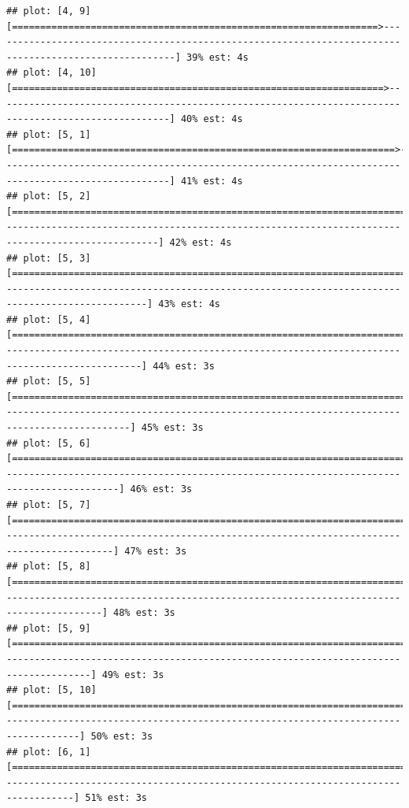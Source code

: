 \documentclass[
]{article}
\begin{document}
\begin{verbatim}
## plot: [4, 9] [=================================================================>-------------------------------------------------------------------------------------------------------] 39% est: 4s 
## plot: [4, 10] [==================================================================>-----------------------------------------------------------------------------------------------------] 40% est: 4s 
## plot: [5, 1] [====================================================================>----------------------------------------------------------------------------------------------------] 41% est: 4s 
## plot: [5, 2] [======================================================================>--------------------------------------------------------------------------------------------------] 42% est: 4s 
## plot: [5, 3] [========================================================================>------------------------------------------------------------------------------------------------] 43% est: 4s 
## plot: [5, 4] [=========================================================================>-----------------------------------------------------------------------------------------------] 44% est: 3s 
## plot: [5, 5] [===========================================================================>---------------------------------------------------------------------------------------------] 45% est: 3s 
## plot: [5, 6] [=============================================================================>-------------------------------------------------------------------------------------------] 46% est: 3s 
## plot: [5, 7] [==============================================================================>------------------------------------------------------------------------------------------] 47% est: 3s 
## plot: [5, 8] [================================================================================>----------------------------------------------------------------------------------------] 48% est: 3s 
## plot: [5, 9] [==================================================================================>--------------------------------------------------------------------------------------] 49% est: 3s 
## plot: [5, 10] [===================================================================================>------------------------------------------------------------------------------------] 50% est: 3s 
## plot: [6, 1] [=====================================================================================>-----------------------------------------------------------------------------------] 51% est: 3s 

\end{verbatim}
\end{document}
